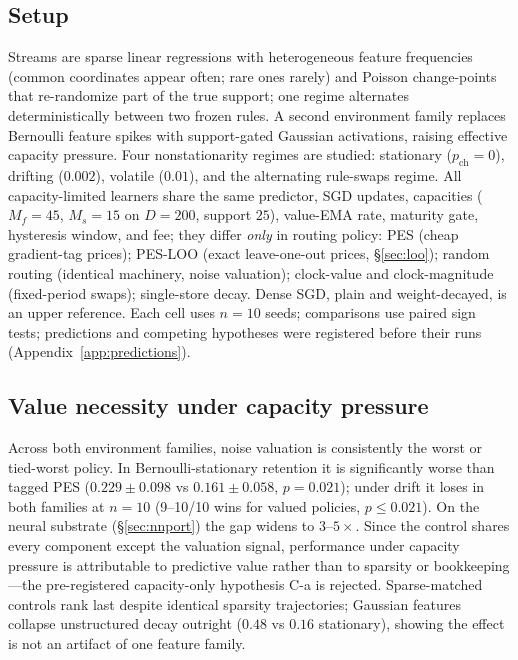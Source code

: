 \documentclass[10pt,twocolumn]{article}
\theoremstyle{definition}
\newcommand{\PES}{PES}
\begin{document}
\subsection{Setup}
Streams are sparse linear regressions with heterogeneous feature frequencies (common coordinates appear
often; rare ones rarely) and Poisson change-points that re-randomize part of the true support; one regime
alternates deterministically between two frozen rules. A second environment family replaces Bernoulli feature
spikes with support-gated Gaussian activations, raising effective capacity pressure. Four nonstationarity
regimes are studied: stationary ($p_{\mathrm{ch}}{=}0$), drifting ($0.002$), volatile ($0.01$), and the
alternating rule-swaps regime. All capacity-limited learners share the same predictor, {SGD} updates,
capacities ($M_f{=}45$, $M_s{=}15$ on $D{=}200$, support $25$), value-{EMA} rate, maturity gate, hysteresis
window, and fee; they differ \emph{only} in routing policy: \PES{} (cheap gradient-tag prices); \PES{}-LOO
(exact leave-one-out prices, \S\ref{sec:loo}); random routing (identical machinery, noise valuation);
clock-value and clock-magnitude (fixed-period swaps); single-store decay. Dense {SGD}, plain and
weight-decayed, is an upper reference. Each cell uses $n{=}10$ seeds; comparisons use paired sign tests;
predictions and competing hypotheses were registered before their runs (Appendix~\ref{app:predictions}).

\subsection{Value necessity under capacity pressure}\label{sec:necessity}
Across both environment families, noise valuation is consistently the worst or tied-worst policy. In
Bernoulli-stationary retention it is significantly worse than tagged \PES{} ($0.229\pm0.098$ vs
$0.161\pm0.058$, $p=0.021$); under drift it loses in both families at $n{=}10$ (9--10/10 wins for valued
policies, $p\le0.021$). On the neural substrate (\S\ref{sec:nnport}) the gap widens to $3$--$5\times$. Since
the control shares every component except the valuation signal, performance under capacity pressure is
attributable to predictive value rather than to sparsity or bookkeeping---the pre-registered capacity-only
hypothesis C-a is rejected. Sparse-matched controls rank last despite identical sparsity trajectories;
Gaussian features collapse unstructured decay outright ($0.48$ vs $0.16$ stationary), showing the effect is
not an artifact of one feature family.
\end{document}
